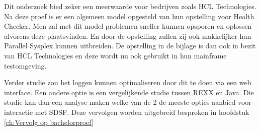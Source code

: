 Dit onderzoek bied zeker een meerwaarde voor bedrijven zoals HCL Technologies. Na deze proef is er een algemeen model opgesteld van hun opstelling voor Health Checker. Men zal met dit model problemen sneller kunnen opsporen en oplossen alvorens deze plaatsvinden. En door de opstelling zullen zij ook makkelijker hun Parallel Sysplex kunnen uitbreiden. De opstelling in de bijlage is dan ook in bezit van HCL Technologies en deze wordt nu ook gebruikt in hun mainframe testomgeving.

Verder studie zou het loggen kunnen optimaliseren door dit te doen via een web interface. Een andere optie is een vergelijkende studie tussen REXX en Java. Die studie kan dan een analyse maken welke van de 2 de meeste opties aanbied voor interactie met SDSF. Deze vervolgen worden uitgebreid besproken in hoofdstuk \ref{ch:Vervolg op bachelorproef}


